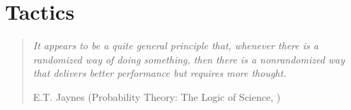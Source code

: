 \chapter{Tactics}
\label{chapter:tactics}
\begin{quotation}
\textit{It appears to be a quite general principle that, whenever there is a randomized way of doing something, then there is a nonrandomized way that delivers better performance but requires more thought.}
\begin{flushright}E.T. Jaynes (Probability Theory: The Logic of Science, \citeyear{Jaynes})\end{flushright}
\end{quotation}







